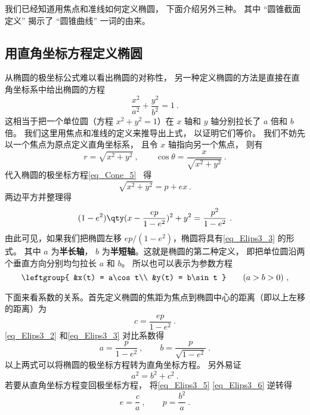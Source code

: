 

我们已经知道用焦点和准线如何定义椭圆， 下面介绍另外三种。 其中 “圆锥截面定义” 揭示了 “圆锥曲线” 一词的由来。

\subsection{用直角坐标方程定义椭圆}
从椭圆的极坐标公式难以看出椭圆的对称性， 另一种定义椭圆的方法是直接在直角坐标系中给出椭圆的方程
\begin{equation}\label{eq_Elips3_3}
\frac{x^2}{a^2} + \frac{y^2}{b^2} = 1~.
\end{equation}
这相当于把一个单位圆（方程 $x^2 + y^2 = 1$）在 $x$ 轴和 $y$ 轴分别拉长了 $a$ 倍和 $b$ 倍。 我们这里用焦点和准线的定义来推导出上式， 以证明它们等价。 我们不妨先以一个焦点为原点定义直角坐标系， 且令 $x$ 轴指向另一个焦点， 则有
\begin{equation}
r = \sqrt{x^2 + y^2}~, \qquad \cos\theta = \frac{x}{\sqrt{x^2 + y^2}}~.
\end{equation}
代入椭圆的极坐标方程\autoref{eq_Cone_5}~ 得
\begin{equation}
\sqrt{x^2 + y^2} = p + ex~.
\end{equation}
两边平方并整理得
\begin{equation}\label{eq_Elips3_2}
(1 - e^2) \qty( x - \frac{ep}{1 - e^2} )^2 + y^2 = \frac{p^2}{1 - e^2}~.
\end{equation}
由此可见，如果我们把椭圆左移 $ep/(1 - e^2)$，椭圆将具有\autoref{eq_Elips3_3} 的形式。 其中 $a$ 为\textbf{半长轴}， $b$ 为\textbf{半短轴}。这就是椭圆的第二种定义， 即把单位圆沿两个垂直方向分别均匀拉长 $a$ 和 $b$。 所以也可以表示为参数方程
\begin{equation}\label{eq_Elips3_1}
\leftgroup{
&x(t) = a\cos t\\
&y(t) = b\sin t
} \qquad
(a > b > 0)~,
\end{equation}

下面来看系数的关系。首先定义椭圆的焦距为焦点到椭圆中心的距离（即以上左移的距离）为
\begin{equation}\label{eq_Elips3_5}
c = \frac{ep}{1 - e^2}~.
\end{equation}
\autoref{eq_Elips3_2} 和\autoref{eq_Elips3_3} 对比系数得
\begin{equation}\label{eq_Elips3_6}
a = \frac{p}{1 - e^2}~, \qquad b = \frac{p}{\sqrt {1 - e^2} }~.
\end{equation}
以上两式可以将椭圆的极坐标方程转为直角坐标方程。 另外易证
\begin{equation}\label{eq_Elips3_7}
a^2 = b^2 + c^2~.
\end{equation}
若要从直角坐标方程变回极坐标方程， 将\autoref{eq_Elips3_5} \autoref{eq_Elips3_6} 逆转得
\begin{equation}\label{eq_Elips3_8}
e = \frac{c}{a}~,\qquad
p = \frac{b^2}{a}~.
\end{equation}

